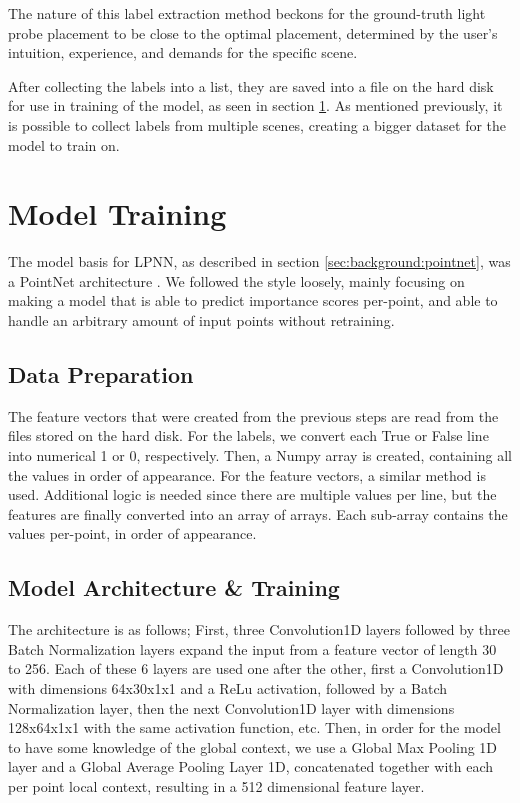 The nature of this label extraction method beckons for the ground-truth light probe placement to be close to the optimal placement, determined by the user's intuition, experience, and demands for the specific scene.

After collecting the labels into a list, they are saved into a file on the hard disk for use in training of the model, as seen in section \ref{sec:model_training}. As mentioned previously, it is possible to collect labels from multiple scenes, creating a bigger dataset for the model to train on.

\section{Model Training}
\label{sec:model_training}

The model basis for LPNN, as described in section \ref{sec:background:pointnet}, was a PointNet architecture \parencite{PointNet2017}. We followed the style loosely, mainly focusing on making a model that is able to predict importance scores per-point, and able to handle an arbitrary amount of input points without retraining. 

\subsection{Data Preparation}
The feature vectors that were created from the previous steps are read from the files stored on the hard disk. For the labels, we convert each True or False line into numerical 1 or 0, respectively. Then, a Numpy array is created, containing all the values in order of appearance.
For the feature vectors, a similar method is used. Additional logic is needed since there are multiple values per line, but the features are finally converted into an array of arrays. Each sub-array contains the values per-point, in order of appearance.

\subsection{Model Architecture \& Training}

The architecture is as follows; First, three Convolution1D layers followed by three Batch Normalization layers expand the input from a feature vector of length 30 to 256. Each of these 6 layers are used one after the other, first a Convolution1D with dimensions 64x30x1x1 and a ReLu activation, followed by a Batch Normalization layer, then the next Convolution1D layer with dimensions 128x64x1x1 with the same activation function, etc. Then, in order for the model to have some knowledge of the global context, we use a Global Max Pooling 1D layer and a Global Average Pooling Layer 1D, concatenated together with each per point local context, resulting in a 512 dimensional feature layer. 


